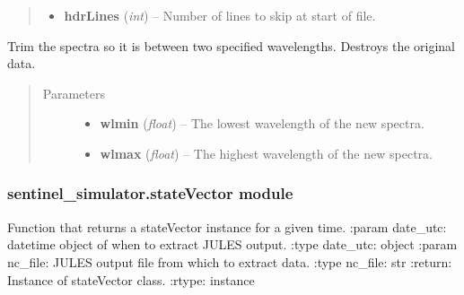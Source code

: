 \documentclass[letterpaper,10pt,english]{sphinxmanual}
\begin{document}
\begin{fulllineitems}
\begin{fulllineitems}
\begin{quote}
\begin{description}
\begin{itemize}
\item {} 
\textbf{hdrLines} (\emph{int}) -- Number of lines to skip at start of file.

\end{itemize}

\end{description}\end{quote}

\end{fulllineitems}


\begin{fulllineitems}
\label{source/sentinel_simulator:sentinel_simulator.spectra.spectra.trim}
Trim the spectra so it is between two specified wavelengths. Destroys the original data.
\begin{quote}\begin{description}
\item[{Parameters}] \leavevmode\begin{itemize}
\item {} 
\textbf{wlmin} (\emph{float}) -- The lowest wavelength of the new spectra.

\item {} 
\textbf{wlmax} (\emph{float}) -- The highest wavelength of the new spectra.

\end{itemize}

\end{description}\end{quote}

\end{fulllineitems}


\end{fulllineitems}



\subsubsection{sentinel\_simulator.stateVector module}
\label{source/sentinel_simulator:module-sentinel_simulator.stateVector}\label{source/sentinel_simulator:sentinel-simulator-statevector-module}

\begin{fulllineitems}
\label{source/sentinel_simulator:sentinel_simulator.stateVector.get_jules_state}
Function that returns a stateVector instance for a given time.
:param date\_utc: datetime object of when to extract JULES output.
:type date\_utc: object
:param nc\_file: JULES output file from which to extract data.
:type nc\_file: str
:return: Instance of stateVector class.
:rtype: instance

\end{fulllineitems}
\end{document}

